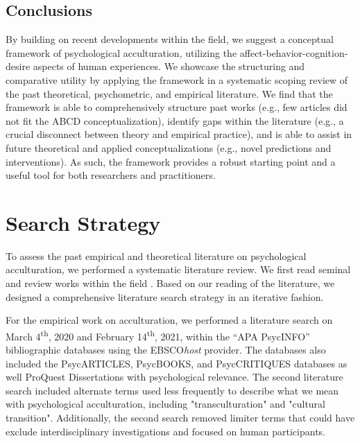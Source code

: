 \documentclass[man, 12pt, a4paper, mask]{apa7}
\begin{document}
\subsection{Conclusions}
By building on recent developments within the field, we suggest a conceptual framework of psychological acculturation, utilizing the affect-behavior-cognition-desire aspects of human experiences. We showcase the structuring and comparative utility by applying the framework in a systematic scoping review of the past theoretical, psychometric, and empirical literature. We find that the framework is able to comprehensively structure past works (e.g., few articles did not fit the ABCD conceptualization), identify gaps within the literature (e.g., a crucial disconnect between theory and empirical practice), and is able to assist in future theoretical and applied conceptualizations (e.g., novel predictions and interventions). As such, the framework provides a robust starting point and a useful tool for both researchers and practitioners.


\printbibliography

\appendix

\section{Search Strategy}
\label{app:AppendixSearchStrategy}

To assess the past empirical and theoretical literature on psychological acculturation, we performed a systematic literature review. We first read seminal and review works within the field \citep[including,][]{Ward2019, Berry1997b, Berry2003, Szapocznik1978, Sam2006a, Rudmin2003a}. Based on our reading of the literature, we designed a comprehensive literature search strategy in an iterative fashion. 

For the empirical work on acculturation, we performed a literature search on March 4\textsuperscript{th}, 2020 and February 14\textsuperscript{th}, 2021, within the ``APA PsycINFO'' bibliographic databases using the EBSCO\textit{host} provider. The databases also included the PsycARTICLES, PsycBOOKS, and PsycCRITIQUES databases as well ProQuest Dissertations with psychological relevance. The second literature search included alternate terms used less frequently to describe what we mean with psychological acculturation, including "transculturation" and "cultural transition". Additionally, the second search removed limiter terms that could have exclude interdisciplinary investigations and focused on human participants.
\end{document}
